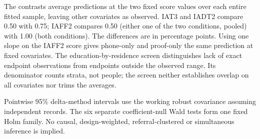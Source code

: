 The contrasts average predictions at the two fixed score values over each entire fitted sample, leaving other covariates as observed. IAT3 and IADT2 compare 0.50 with 0.75; IAFF2 compares 0.50 (either one of the two conditions, pooled) with 1.00 (both conditions). The differences are in percentage points. Using one slope on the IAFF2 score gives phone-only and proof-only the same prediction at fixed covariates. The education-by-residence screen distinguishes lack of exact endpoint observations from endpoints outside the observed range. Its denominator counts strata, not people; the screen neither establishes overlap on all covariates nor trims the averages.

Pointwise 95\% delta-method intervals use the working robust covariance assuming independent records. The six separate coefficient-null Wald tests form one fixed Holm family. No causal, design-weighted, referral-clustered or simultaneous inference is implied.
